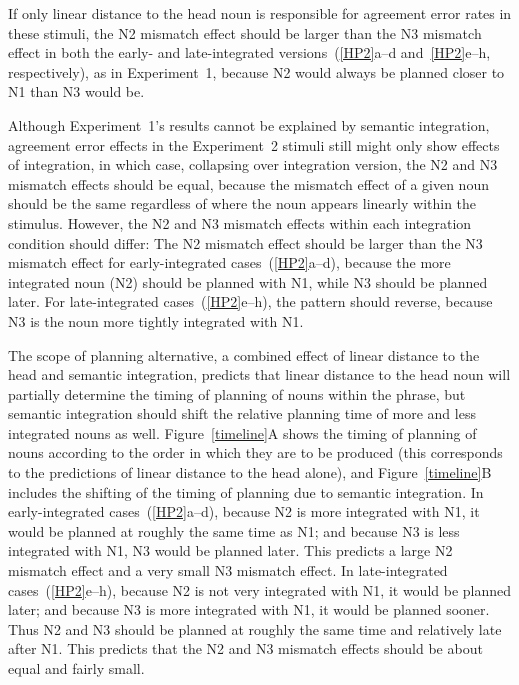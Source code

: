 \documentclass[12pt,titlepage]{article}
\newcommand{\insertnote}[1]{%
\vspace{\baselineskip}
\noindent
\begin{minipage}{\textwidth}
\begin{center}
========================= \\
Insert #1 About Here \\
========================= \\
\end{center}
\vspace{.8\baselineskip}
\end{minipage}}
\begin{document}
If only linear distance to the head noun is responsible for agreement error
rates in these stimuli, the N2 mismatch effect should be larger than the N3
mismatch effect in both the early- and late-integrated
versions~(\ref{HP2}a--d and~\ref{HP2}e--h, respectively), as in
Experiment~1, because N2 would always be planned closer to N1 than N3 would
be.

Although Experiment~1's results cannot be explained by semantic
integration, agreement error effects in the Experiment~2 stimuli still
might only show effects of integration, in which case, collapsing over
integration version, the N2 and N3 mismatch effects should be equal,
because the mismatch effect of a given noun should be the same regardless
of where the noun appears linearly within the stimulus.  However, the N2
and N3 mismatch effects within each integration condition should differ:
The N2 mismatch effect should be larger than the N3 mismatch effect for
early-integrated cases~(\ref{HP2}a--d), because the more integrated noun
(N2) should be planned with N1, while N3 should be planned later.  For
late-integrated cases~(\ref{HP2}e--h), the pattern should reverse, because
N3 is the noun more tightly integrated with N1.

The scope of planning alternative, a combined effect of linear distance to
the head and semantic integration, predicts that linear distance to the
head noun will partially determine the timing of planning of nouns within
the phrase, but semantic integration should shift the relative planning
time of more and less integrated nouns as well.  Figure~\ref{timeline}A
shows the timing of planning of nouns according to the order in which they
are to be produced (this corresponds to the predictions of linear distance
to the head alone), and Figure~\ref{timeline}B includes the shifting of the
timing of planning due to semantic integration.  In early-integrated
cases~(\ref{HP2}a--d), because N2 is more integrated with N1, it would be
planned at roughly the same time as N1; and because N3 is less integrated
with N1, N3 would be planned later.  This predicts a large N2 mismatch
effect and a very small N3 mismatch effect.  In late-integrated
cases~(\ref{HP2}e--h), because N2 is not very integrated with N1, it would
be planned later; and because N3 is more integrated with N1, it would be
planned sooner.  Thus N2 and N3 should be planned at roughly the same time
and relatively late after N1.  This predicts that the N2 and N3 mismatch
effects should be about equal and fairly small.

\end{document}

